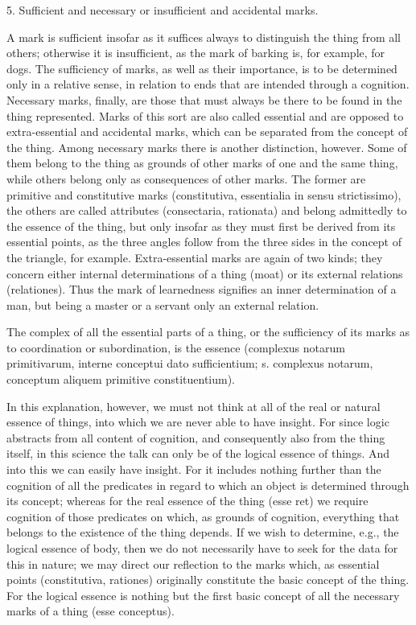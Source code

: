 5. Sufficient and necessary or insufficient and accidental marks.

A mark is sufficient insofar as it suffices always
to distinguish the thing from all others;
otherwise it is insufficient, as the mark of barking is,
for example, for dogs.
The sufficiency of marks, as well as their importance,
is to be determined only in a relative sense,
in relation to ends that are intended through a cognition.
Necessary marks, finally, are those that must always be there to be found
in the thing represented.
Marks of this sort are also called essential and are
opposed to extra-essential and accidental marks,
which can be separated from the concept of the thing.
Among necessary marks there is another distinction, however.
Some of them belong to the thing as grounds of other marks of one and
the same thing, while others belong only as consequences of other marks.
The former are primitive and constitutive marks
(constitutiva, essentialia in sensu strictissimo),
the others are called attributes (consectaria, rationata)
and belong admittedly to the essence of the thing,
but only insofar as they must first be derived from its essential points,
as the three angles follow from the three sides
in the concept of the triangle, for example.
Extra-essential marks are again of two kinds;
they concern either internal determinations of a thing (moat) or
its external relations (relationes).
Thus the mark of learnedness signifies an inner determination of a man,
but being a master or a servant only an external relation.

The complex of all the essential parts of a thing, or the sufficiency of its
marks as to coordination or subordination, is the essence
(complexus notarum primitivarum, interne conceptui dato sufficientium;
s. complexus notarum, conceptum aliquem primitive constituentium).

In this explanation, however, we must not think at all of
the real or natural essence of things,
into which we are never able to have insight.
For since logic abstracts from all content of cognition, and
consequently also from the thing itself, in this science
the talk can only be of the logical essence of things.
And into this we can easily have insight.
For it includes nothing further than the cognition of
all the predicates in regard to which
an object is determined through its concept;
whereas for the real essence of the thing (esse ret)
we require cognition of those predicates on which,
as grounds of cognition, everything that belongs
to the existence of the thing depends.
If we wish to determine, e.g., the logical essence of body, then
we do not necessarily have to seek for the data for this in nature;
we may direct our reflection to the marks which, as essential points
(constitutiva, rationes) originally constitute the basic concept of the thing.
For the logical essence is nothing but the first basic concept of
all the necessary marks of a thing (esse conceptus).

